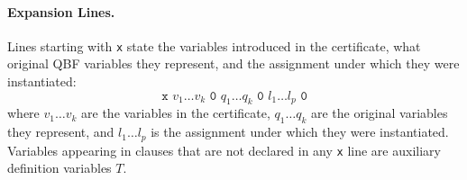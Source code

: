 \documentclass[runningheads]{llncs}
\begin{document}
\paragraph*{Expansion Lines.}
Lines starting with \texttt{x} state the variables introduced in the certificate, what original QBF variables they represent, and the assignment under which they were instantiated:
\begin{equation*}
    \texttt{x } v_1 \dots v_k \texttt{ 0 } q_1 \dots q_k \texttt{ 0 } l_1 \dots l_p \texttt{ 0}
\end{equation*}
where $v_1 \dots v_k$ are the variables in the certificate, $q_1 \dots q_k$ are the original variables they represent, and $l_1 \dots l_p$ is the assignment under which they were instantiated.
Variables appearing in clauses that are not declared in any \texttt{x} line are auxiliary definition variables $T$.
\end{document}
